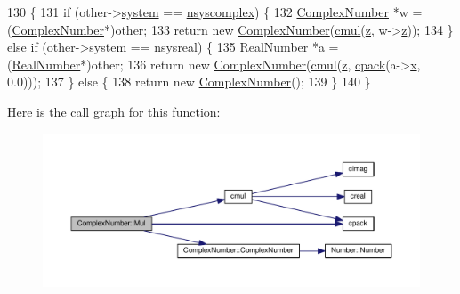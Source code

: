 \begin{DoxyCode}
130 \{
131     \textcolor{keywordflow}{if} (other->\hyperlink{structNumber_a2ceda5601c42288626e76b06878e7476}{system} == \hyperlink{numb_8h_a1475a201d2346881ce88dfbacf628c7da3b38c947375a3db3a4bc184a11c8ee42}{nsyscomplex}) \{
132         \hyperlink{structComplexNumber}{ComplexNumber} *w = (\hyperlink{structComplexNumber}{ComplexNumber}*)other;
133         \textcolor{keywordflow}{return} \textcolor{keyword}{new} \hyperlink{structComplexNumber_a610e9db9ff0ddb0140e30d235ab64e44}{ComplexNumber}(\hyperlink{complex_8h_a340ad83d03bcc727538d25dcf6dd26e9}{cmul}(\hyperlink{structComplexNumber_a5f72da71f4ce0d88076a391369239042}{z}, w->\hyperlink{structComplexNumber_a5f72da71f4ce0d88076a391369239042}{z}));
134     \} \textcolor{keywordflow}{else}  \textcolor{keywordflow}{if} (other->\hyperlink{structNumber_a2ceda5601c42288626e76b06878e7476}{system} == \hyperlink{numb_8h_a1475a201d2346881ce88dfbacf628c7dae72cf8673109b15268d1c0837e8bff86}{nsysreal}) \{
135         \hyperlink{structRealNumber}{RealNumber} *a = (\hyperlink{structRealNumber}{RealNumber}*)other;
136         \textcolor{keywordflow}{return} \textcolor{keyword}{new} \hyperlink{structComplexNumber_a610e9db9ff0ddb0140e30d235ab64e44}{ComplexNumber}(\hyperlink{complex_8h_a340ad83d03bcc727538d25dcf6dd26e9}{cmul}(\hyperlink{structComplexNumber_a5f72da71f4ce0d88076a391369239042}{z}, \hyperlink{complex_8h_a980e6e049f7902b05fc9eb5614b07a5c}{cpack}(a->\hyperlink{structRealNumber_ac33d80bee75448490199a0aa48ccce1e}{x}, 0.0)));
137     \} \textcolor{keywordflow}{else} \{
138         \textcolor{keywordflow}{return} \textcolor{keyword}{new} \hyperlink{structComplexNumber_a610e9db9ff0ddb0140e30d235ab64e44}{ComplexNumber}();
139     \}
140 \}
\end{DoxyCode}


Here is the call graph for this function\+:\nopagebreak
\begin{figure}[H]
\begin{center}
\leavevmode
\includegraphics[width=350pt]{structComplexNumber_a8b876b0e7e776fa2f0fa2bc034cc224b_cgraph}
\end{center}
\end{figure}


